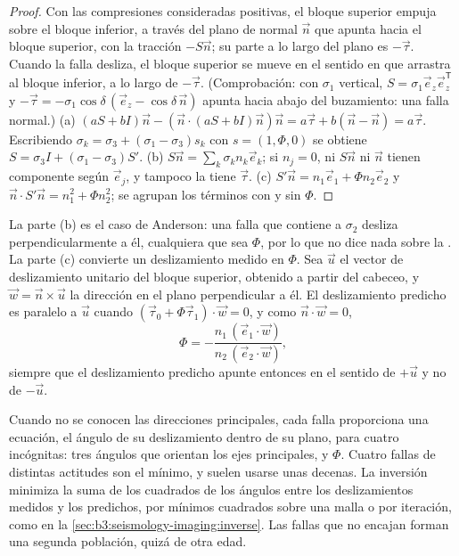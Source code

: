 \begin{proof}
Con las compresiones consideradas positivas, el bloque superior empuja sobre el bloque inferior, a través del
plano de normal $\vec n$ que apunta hacia el bloque superior, con la
tracción $-S\vec n$; su parte a lo largo del plano es $-\vec\tau$. Cuando la
falla desliza, el bloque superior se mueve en el sentido en que arrastra al bloque inferior, a lo largo de
$-\vec\tau$. (Comprobación: con $\sigma_1$ vertical, $S = \sigma_1\vec e_z\vec
e_z^{\mathsf T}$ y $-\vec\tau = -\sigma_1\cos\delta\,(\vec e_z -
\cos\delta\,\vec n)$ apunta hacia abajo del buzamiento: una falla normal.)
(a) $(aS + bI)\vec n - (\vec n\cdot(aS + bI)\vec n)\vec n = a\vec\tau + b(\vec
n - \vec n) = a\vec\tau$. Escribiendo $\sigma_k = \sigma_3 + (\sigma_1 -
\sigma_3)s_k$ con $s = (1, \Phi, 0)$ se obtiene $S = \sigma_3 I + (\sigma_1 -
\sigma_3)S'$.
(b) $S\vec n = \sum_k\sigma_kn_k\vec e_k$; si $n_j = 0$, ni $S\vec n$
ni $\vec n$ tienen componente según $\vec e_j$, y tampoco la tiene $\vec\tau$.
(c) $S'\vec n = n_1\vec e_1 + \Phi n_2\vec e_2$ y $\vec n\cdot S'\vec n =
n_1^2 + \Phi n_2^2$; se agrupan los términos con y sin $\Phi$.
\end{proof}

La parte (b) es el caso de Anderson: una falla que contiene a $\sigma_2$ desliza
perpendicularmente a él, cualquiera que sea $\Phi$, por lo que no dice nada sobre la . La parte (c) convierte un deslizamiento medido en $\Phi$. Sea $\vec u$ el vector
de deslizamiento unitario del bloque superior, obtenido a partir del cabeceo, y $\vec w = \vec n\times\vec
u$ la dirección en el plano perpendicular a él. El deslizamiento predicho es
paralelo a $\vec u$ cuando $(\vec\tau_0 + \Phi\vec\tau_1)\cdot\vec w = 0$, y
como $\vec n\cdot\vec w = 0$,
\[
  \Phi = -\frac{n_1\,(\vec e_1\cdot\vec w)}{n_2\,(\vec e_2\cdot\vec w)} ,
\]
siempre que el deslizamiento predicho apunte entonces en el sentido de $+\vec u$ y no de $-\vec u$.

Cuando no se conocen las direcciones principales, cada falla proporciona una ecuación,
el ángulo de su deslizamiento dentro de su plano, para cuatro incógnitas: tres ángulos que
orientan los ejes principales, y $\Phi$. Cuatro fallas de distintas actitudes son
el mínimo, y suelen usarse unas decenas. La inversión minimiza la suma de los
cuadrados de los ángulos entre los deslizamientos medidos y los predichos, por mínimos cuadrados
sobre una malla o por iteración, como en la \cref{sec:b3:seismology-imaging:inverse}.
Las fallas que no encajan forman una segunda población, quizá de otra edad.

